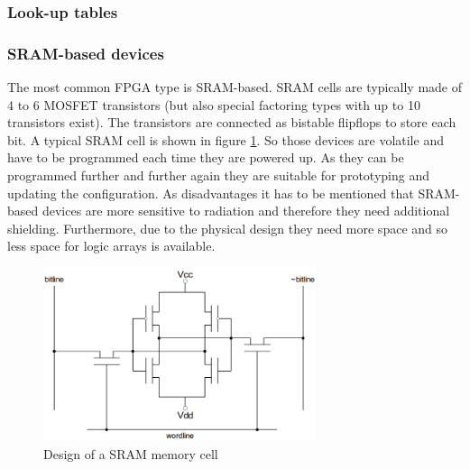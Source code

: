 \subsubsection{Look-up tables}
\subsubsection{SRAM-based devices}
The most common FPGA type is SRAM-based. SRAM cells are typically made of 4 to 6 MOSFET transistors (but also special factoring types with up to 10 transistors exist). The transistors are connected as bistable flipflops to store each bit. A typical SRAM cell is shown in figure \ref{fig:SRAMaufbau}. So those devices are volatile and have to be programmed each time they are powered up. As they can be programmed further and further again they are suitable for prototyping and updating the configuration. As disadvantages it has to be mentioned that SRAM-based devices are more sensitive to radiation and therefore they need additional shielding. Furthermore, due to the physical design they need more space and so less space for logic arrays is available.\cite{Maxfield2009}\\
\begin{figure}[htbp]
\begin{center}
\includegraphics[width=8cm,keepaspectratio=true]{bilder/png/SRAMaufbau}
\caption{Design of a SRAM memory cell\cite{Core16}}
\label{fig:SRAMaufbau}
\end{center}
\end{figure}
